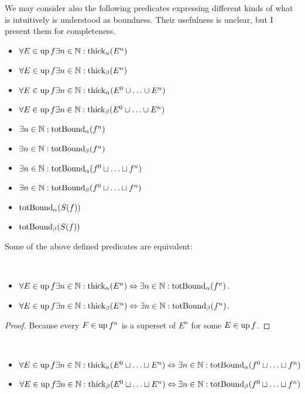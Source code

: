 We may consider also the following predicates expressing different
kinds of what is intuitively is understood as boundness. Their usefulness
is unclear, but I present them for completeness.
\begin{itemize}
\item $\forall E\in\operatorname{up} f\exists n\in\mathbb{N}:\operatorname{thick}_{\alpha}(E^{n})$
\item $\forall E\in\operatorname{up} f\exists n\in\mathbb{N}:\operatorname{thick}_{\beta}(E^{n})$
\item $\forall E\in\operatorname{up} f\exists n\in\mathbb{N}:\operatorname{thick}_{\alpha}(E^{0}\cup\ldots\cup E^{n})$
\item $\forall E\in\operatorname{up} f\exists n\in\mathbb{N}:\operatorname{thick}_{\beta}(E^{0}\cup\ldots\cup E^{n})$
\item $\exists n\in\mathbb{N}:\operatorname{totBound}_{\alpha}(f^{n})$
\item $\exists n\in\mathbb{N}:\operatorname{totBound}_{\beta}(f^{n})$
\item $\exists n\in\mathbb{N}:\operatorname{totBound}_{\alpha}(f^{0}\sqcup\ldots\sqcup f^{n})$
\item $\exists n\in\mathbb{N}:\operatorname{totBound}_{\beta}(f^{0}\sqcup\ldots\sqcup f^{n})$
\item $\operatorname{totBound}_{\alpha}(S(f))$
\item $\operatorname{totBound}_{\beta}(S(f))$
\end{itemize}
Some of the above defined predicates are equivalent:
\begin{prop}
~
\begin{itemize}
\item $\forall E\in\operatorname{up} f\exists n\in\mathbb{N}:\operatorname{thick}_{\alpha}(E^{n})\Leftrightarrow\exists n\in\mathbb{N}:\operatorname{totBound}_{\alpha}(f^{n})$.
\item $\forall E\in\operatorname{up} f\exists n\in\mathbb{N}:\operatorname{thick}_{\beta}(E^{n})\Leftrightarrow\exists n\in\mathbb{N}:\operatorname{totBound}_{\beta}(f^{n})$.
\end{itemize}
\end{prop}
\begin{proof}
Because every $F\in\operatorname{up} f^{n}$ is a superset of $E^{n}$ for some
$E\in\operatorname{up} f$.\end{proof}
\begin{prop}
~
\begin{itemize}
\item $\forall E\in\operatorname{up} f\exists n\in\mathbb{N}:\operatorname{thick}_{\alpha}(E^{0}\sqcup\ldots\sqcup E^{n})\Leftrightarrow\exists n\in\mathbb{N}:\operatorname{totBound}_{\alpha}(f^{0}\sqcup\ldots\sqcup f^{n})$
\item $\forall E\in\operatorname{up} f\exists n\in\mathbb{N}:\operatorname{thick}_{\beta}(E^{0}\sqcup\ldots\sqcup E^{n})\Leftrightarrow\exists n\in\mathbb{N}:\operatorname{totBound}_{\beta}(f^{0}\sqcup\ldots\sqcup f^{n})$
\end{itemize}
\end{prop}

